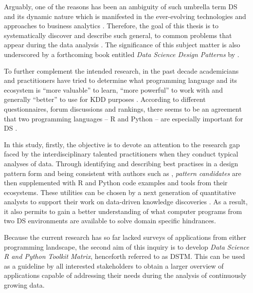 Arguably, one of the reasons has been an ambiguity of such umbrella term \ac{DS} and its dynamic nature which is manifested in the ever-evolving technologies and approaches to business analytics \parencite{CarlShan2015TheScientists}.
Therefore, the goal of this thesis is to systematically discover and describe such general,  to common problems that appear during the data analysis \parencite[853]{HeffreMheer2006}.  
The significance of this subject matter is also underscored by a forthcoming book entitled \emph{Data Science Design Patterns} by \textcite{Todd2019}.

To further complement the intended research, in the past decade academicians and practitioners have tried to determine what programming language and its ecosystem is \enquote{more valuable} to learn, \enquote{more powerful} to work with and generally \enquote{better} to use for \ac{KDD} purposes \parencites{DavidMa2016RAdvances}{PeterWayner2017PythonShare}{MartijnTheuwissen2015R}{ChengHanLee2015HowFirst}.
According to different questionnaires, forum discussions and rankings, there seems to be an agreement that two programming languages -- R and Python -- are especially important for \ac{DS} \parencites{Muenchen2017TheSoftware}. 

In this study, firstly, the objective is to devote an attention to the research gap faced by the interdisciplinary talented practitioners when they conduct typical analyses of data. 
Through identifying and describing best practises in a design pattern form and being consistent with authors such as \textcite{DPCPQT2011}, \emph{pattern candidates} are then supplemented with R and Python code examples and tools from their ecosystems. 
These utilities can be chosen by a next generation of quantitative analysts to support their work on data-driven knowledge discoveries \parencite{MosaicDataScience2017}. 
As a result, it also permits to gain a better understanding of what computer programs from two \ac{DS} environments are available to solve domain specific hindrances.

Because the current research has so far lacked surveys of applications from either programming landscape, the second aim of this inquiry is to develop \emph{Data Science R and Python Toolkit Matrix}, henceforth referred to as \ac{DSTM}.
This can be used as a guideline by all interested stakeholders to obtain a larger overview of applications capable of addressing their needs during the analysis of continuously growing data.

